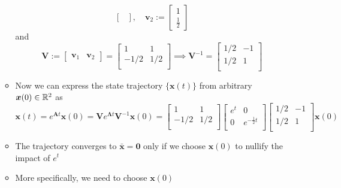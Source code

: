 \documentclass[12pt,a4paper]{article}
\begin{document}
\begin{itemize}
\begin{itemize}
\begin{equation}
\begin{bmatrix}
      \end{bmatrix},
      \quad
      \bm{v}_{2} :=
      \begin{bmatrix}
        1 \\
        \frac{1}{2}
      \end{bmatrix}
    \end{equation}
    and
    \begin{equation}\nonumber%
      \bm{V}:=
      \begin{bmatrix}
        \bm{v}_{1} & \bm{v}_{2}
      \end{bmatrix}
      =
      \begin{bmatrix}
        1 & 1 \\
        -1/2 & 1/2 \\
      \end{bmatrix}
      \implies
      \bm{V}^{-1} =
      \begin{bmatrix}
        1/2 & -1 \\
        1/2 & 1 \\
      \end{bmatrix}
      \end{equation}
    \item Now we can express the state trajectory $\{\bm{x}(t)\}$ from arbitrary $\bm{x}(0)\in \mathbb{R}^{2}$ as
      \begin{equation}\nonumber%
        \bm{x}(t) =
        e^{\bm{A}t}\bm{x}(0)
        =
        \bm{V}e^{\bm{\Lambda}t}\bm{V}^{-1}\bm{x}(0)
        =
      \begin{bmatrix}
        1 & 1 \\
        -1/2 & 1/2 \\
      \end{bmatrix}
      \begin{bmatrix}
        e^{t} & 0 \\
        0 & e^{- \frac{1}{2}t} \\
      \end{bmatrix}
      \begin{bmatrix}
        1/2 & -1 \\
        1/2 & 1 \\
      \end{bmatrix}
      \bm{x}(0)
      \end{equation}
    \item
      The trajectory converges to $\bar{\bm{x}}=\bm{0}$
      only if we choose $\bm{x}(0)$
      to nullify the impact of $e^{t}$
    \item More specifically, we need to choose $\bm{x}(0)$

\end{itemize}
\end{itemize}
\end{document}
